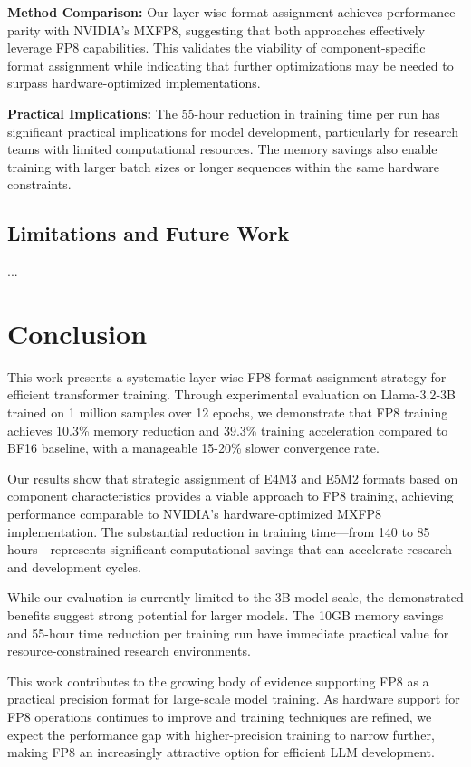 \documentclass[conference]{IEEEtran}
\begin{document}
\textbf{Method Comparison:} Our layer-wise format assignment achieves performance parity with NVIDIA's MXFP8, suggesting that both approaches effectively leverage FP8 capabilities. This validates the viability of component-specific format assignment while indicating that further optimizations may be needed to surpass hardware-optimized implementations.

\textbf{Practical Implications:} The 55-hour reduction in training time per run has significant practical implications for model development, particularly for research teams with limited computational resources. The memory savings also enable training with larger batch sizes or longer sequences within the same hardware constraints.

\subsection{Limitations and Future Work}
...
\section{Conclusion}

This work presents a systematic layer-wise FP8 format assignment strategy for efficient transformer training. Through experimental evaluation on Llama-3.2-3B trained on 1 million samples over 12 epochs, we demonstrate that FP8 training achieves 10.3\% memory reduction and 39.3\% training acceleration compared to BF16 baseline, with a manageable 15-20\% slower convergence rate.

Our results show that strategic assignment of E4M3 and E5M2 formats based on component characteristics provides a viable approach to FP8 training, achieving performance comparable to NVIDIA's hardware-optimized MXFP8 implementation. The substantial reduction in training time—from 140 to 85 hours—represents significant computational savings that can accelerate research and development cycles.

While our evaluation is currently limited to the 3B model scale, the demonstrated benefits suggest strong potential for larger models. The 10GB memory savings and 55-hour time reduction per training run have immediate practical value for resource-constrained research environments.

This work contributes to the growing body of evidence supporting FP8 as a practical precision format for large-scale model training. As hardware support for FP8 operations continues to improve and training techniques are refined, we expect the performance gap with higher-precision training to narrow further, making FP8 an increasingly attractive option for efficient LLM development.
\end{document}
